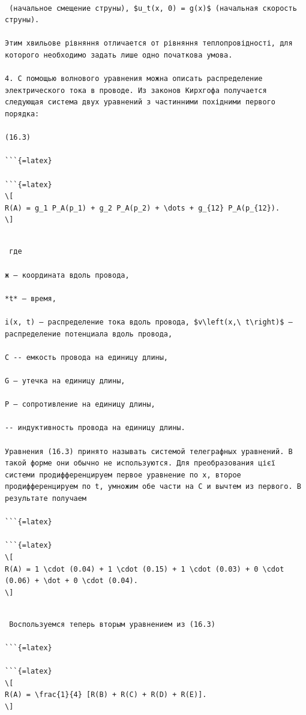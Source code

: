 \documentclass[
  ukrainian,
]{article}
\begin{document}
\begin{verbatim}

 (начальное смещение струны), $u_t(x, 0) = g(x)$ (начальная скорость струны).

Этим хвильове рівняння отличается от рівняння теплопровідності, для которого необходимо задать лише одно початкова умова.

4. С помощью волнового уравнения можна описать распределение электрического тока в проводе. Из законов Кирхгофа получается следующая система двух уравнений з частинними похідними первого порядка:

(16.3)

```{=latex}

```{=latex}
\[
R(A) = g_1 P_A(p_1) + g_2 P_A(p_2) + \dots + g_{12} P_A(p_{12}).
\]
\end{verbatim}

\begin{verbatim}

 где

ж — координата вдоль провода,

*t* — время,

i(x, t) — распределение тока вдоль провода, $v\left(x,\ t\right)$ — распределение потенциала вдоль провода,

С -- емкость провода на единицу длины,

G — утечка на единицу длины,

Р — сопротивление на единицу длины,

-- индуктивность провода на единицу длины.

Уравнения (16.3) принято называть системой телеграфных уравнений. В такой форме они обычно не используются. Для преобразования цієї системи продифференцируем первое уравнение по x, второе продифференцируем по t, умножим обе части на C и вычтем из первого. В результате получаем

```{=latex}

```{=latex}
\[
R(A) = 1 \cdot (0.04) + 1 \cdot (0.15) + 1 \cdot (0.03) + 0 \cdot (0.06) + \dot + 0 \cdot (0.04).
\]
\end{verbatim}

\begin{verbatim}

 Воспользуемся теперь вторым уравнением из (16.3)

```{=latex}

```{=latex}
\[
R(A) = \frac{1}{4} [R(B) + R(C) + R(D) + R(E)].
\]
\end{verbatim}
\end{document}
